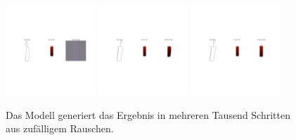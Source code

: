 \begin{figure}[h]
	\centering
	\includegraphics[width=0.3\textwidth]{bilder/0.jpg}
	\includegraphics[width=0.3\textwidth]{bilder/1.jpg}
	\includegraphics[width=0.3\textwidth]{bilder/15.jpg}
	\caption[Verschiedene Trainingsschritte]{Das Modell generiert das Ergebnis in mehreren Tausend Schritten aus zufälligem Rauschen.}
	\label{fig:trichter}
\end{figure}


